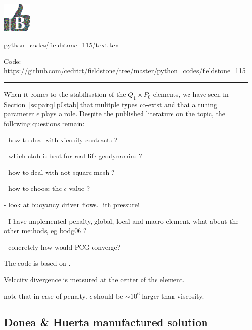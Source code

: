 \includegraphics[height=1.5cm]{images/pictograms/benchmark}

\begin{flushright} {\tiny {\color{gray} python\_codes/fieldstone\_115/text.tex}} \end{flushright}



\begin{center}
\inpython
{\small Code: \url{https://github.com/cedrict/fieldstone/tree/master/python_codes/fieldstone_115}}
\end{center}

\par\noindent\rule{\textwidth}{0.4pt}




When it comes to the stabilisation of the $Q_1\times P_0$ elements, 
we have seen in Section~\ref{ss:pairq1p0stab} that mulitple types co-exist
and that a tuning parameter $\epsilon$ plays a role. 
Despite the published literature on the topic, the following questions remain:

- how to deal with vicosity contrasts ? 

- which stab is best for real life geodynamics ? 

- how to deal with not square mesh ?

- how to choose the $\epsilon$ value ?

- look at buoyancy driven flows. lith pressure!

- I have implemented penalty, global, local and macro-element. what about the other methods, eg bodg06 ?

- concretely how would PCG converge?

The code is based on .

Velocity divergence is measured at the center of the element.

note that in case of penalty, $\epsilon$ should be $\sim 10^6$ larger than viscosity.

\subsection*{Donea \& Huerta manufactured solution}


